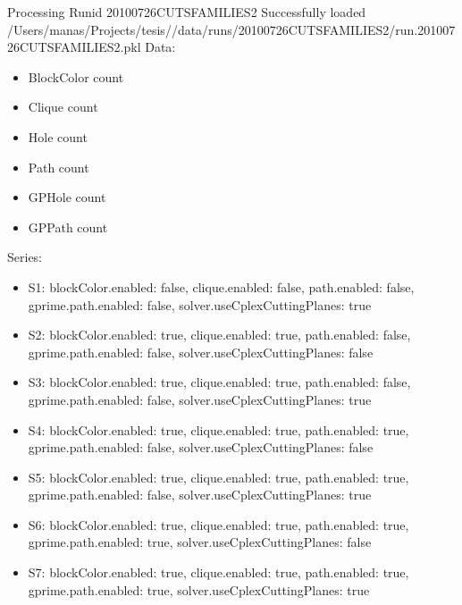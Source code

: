 \documentclass[landscape, 12pt]{report}
\begin{document}
	Processing Runid 20100726CUTSFAMILIES2
	 Successfully loaded /Users/manas/Projects/tesis//data/runs/20100726CUTSFAMILIES2/run.20100726CUTSFAMILIES2.pkl
	Data:
	\begin{itemize}
	\item BlockColor count
	\item Clique count
	\item Hole count
	\item Path count
	\item GPHole count
	\item GPPath count
	\end{itemize}
	Series:
	\begin{itemize}
	\item S1: blockColor.enabled: false, clique.enabled: false, path.enabled: false, gprime.path.enabled: false, solver.useCplexCuttingPlanes: true
	\item S2: blockColor.enabled: true, clique.enabled: true, path.enabled: false, gprime.path.enabled: false, solver.useCplexCuttingPlanes: false
	\item S3: blockColor.enabled: true, clique.enabled: true, path.enabled: false, gprime.path.enabled: false, solver.useCplexCuttingPlanes: true
	\item S4: blockColor.enabled: true, clique.enabled: true, path.enabled: true, gprime.path.enabled: false, solver.useCplexCuttingPlanes: false
	\item S5: blockColor.enabled: true, clique.enabled: true, path.enabled: true, gprime.path.enabled: false, solver.useCplexCuttingPlanes: true
	\item S6: blockColor.enabled: true, clique.enabled: true, path.enabled: true, gprime.path.enabled: true, solver.useCplexCuttingPlanes: false
	\item S7: blockColor.enabled: true, clique.enabled: true, path.enabled: true, gprime.path.enabled: true, solver.useCplexCuttingPlanes: true
	\end{itemize}
\end{document}
